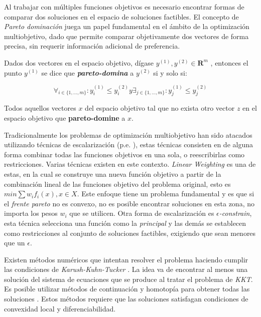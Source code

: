 Al trabajar con múltiples funciones objetivos es necesario encontrar formas de comparar dos soluciones en el espacio de soluciones factibles.
El concepto de \textit{Pareto dominación} juega un papel fundamental en el ámbito de la optimización multiobjetivo, dado que permite comparar objetivamente dos vectores de forma precisa, sin requerir información adicional de preferencia.

\begin{definition}
\label{definition:pareto-dominance}

    Dados dos vectores en el espacio objetivo, dígase $y^{(1)}, y^{(2)} \in \mathbf{R}^m$ , entonces el punto $y^{(1)}$ se dice que \textbf{\textit{pareto-domina}} a $y^{(2)}$ si y solo si:

    \begin{equation}
        \forall_{i\in\{1,\dots,m\}}: y_i^{(1)} \leq y_i^{(2)} y \exists_{j\in\{1,\dots,m\}}: y_j^{(1)} \le y_j^{(2)}
    \end{equation}
\end{definition}

\begin{definition}
\label{definition:pareto-front}
    Todos aquellos vectores $x$ del espacio objetivo tal que no exista otro vector $z$ en el espacio objetivo que \textbf{pareto-domine} a $x$.
\end{definition}

Tradicionalmente los problemas de optimización multiobjetivo han sido atacados utilizando técnicas de escalarización (p.e. \parencite{miettinen2012nonlinear}), estas técnicas consisten en de alguna forma combinar todas las funciones objetivos en una sola, o reescribirlas como restricciones.
Varias técnicas existen en este contexto. \textit{Linear Weighting} es una de estas, en la cual se construye una nueva función objetivo a partir de la combinación lineal de las funciones objetivo del problema original, esto es $min \sum w_i f_i(x), x \in X$.
Este enfoque tiene un problema fundamental y es que si el \emph{frente pareto} no es convexo, no es posible encontrar soluciones en esta zona, no importa los pesos $w_i$ que se utilicen.
Otra forma de escalarización es \textit{$\epsilon$-constrain}, esta técnica selecciona una función como la \textit{principal} y las demás se establecen como restricciones al conjunto de soluciones factibles, exigiendo que sean menores que un $\epsilon$.

Existen métodos numéricos que intentan resolver el problema haciendo cumplir las condiciones de \emph{Karush-Kuhn-Tucker} \parencite{kuhn2014nonlinear}.
La idea va de encontrar al menos una solución del sistema de ecuaciones que se produce al tratar el problema de \textit{KKT}.
Es posible utilizar métodos de continuación y homotopía para obtener todas las soluciones \parencite{hillermeier2001nonlinear, schutze2005continuation}.
Estos métodos requiere que las soluciones satisfagan condiciones de convexidad local y diferenciabilidad.


